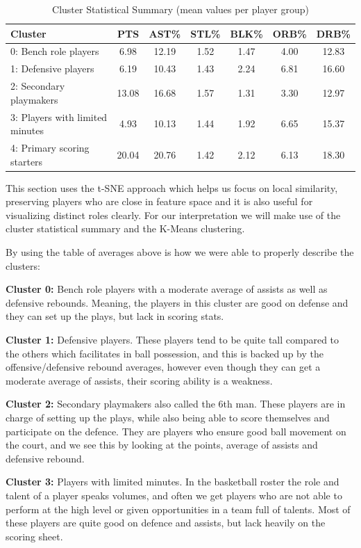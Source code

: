 \documentclass{article}
\begin{document}
\begin{table}[h!]
\centering
\caption{Cluster Statistical Summary (mean values per player group)}
\label{tab:cluster_stats}
\begin{tabular}{lcccccc}
\toprule
\textbf{Cluster} & \textbf{PTS} & \textbf{AST\%} & \textbf{STL\%} & \textbf{BLK\%} & \textbf{ORB\%} & \textbf{DRB\%} \\
\midrule
0: Bench role players & 6.98 & 12.19 & 1.52 & 1.47 & 4.00 & 12.83 \\
1: Defensive players & 6.19 & 10.43 & 1.43 & 2.24 & 6.81 & 16.60 \\
2: Secondary playmakers & 13.08 & 16.68 & 1.57 & 1.31 & 3.30 & 12.97 \\
3: Players with limited minutes & 4.93 & 10.13 & 1.44 & 1.92 & 6.65 & 15.37 \\
4: Primary scoring starters & 20.04 & 20.76 & 1.42 & 2.12 & 6.13 & 18.30 \\
\bottomrule
\end{tabular}
\end{table}

This section uses the t-SNE approach which helps us focus on local similarity, preserving players who are close in feature space and it is also useful for visualizing distinct roles clearly. For our interpretation we will make use of the cluster statistical summary and the K-Means clustering.

By using the table of averages above is how we were able to properly describe the clusters:

{\bf Cluster 0:} Bench role players with a moderate average of assists as well as defensive rebounds. Meaning, the players in this cluster are good on defense and they can set up the plays, but lack in scoring stats.

{\bf Cluster 1:} Defensive players. These players tend to be quite tall compared to the others which facilitates in ball possession, and this is backed up by the offensive/defensive rebound averages, however even though they can get a moderate average of assists, their scoring ability is a weakness.

{\bf Cluster 2:} Secondary playmakers also called the 6th man. These players are in charge of setting up the plays, while also being able to score themselves and participate on the defence. They are players who ensure good ball movement on the court, and we see this by looking at the points, average of assists and defensive rebound. 

{\bf Cluster 3:} Players with limited minutes. In the basketball roster the role and talent of a player speaks volumes, and often we get players who are not able to perform at the high level or given opportunities in a team full of talents. Most of these players are quite good on defence and assists, but lack heavily on the scoring sheet.
\end{document}
